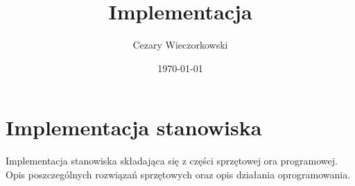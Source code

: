 \documentclass[../main.tex]{subfiles}
\author{Cezary Wieczorkowski}
\date{\today}
\title{Implementacja}
\begin{document}
\section{Implementacja stanowiska}

Implementacja stanowiska składająca się z części sprzętowej ora programowej. Opis poszczególnych rozwiązań sprzętowych oraz opis 
działania oprogramowania.
\end{document}
